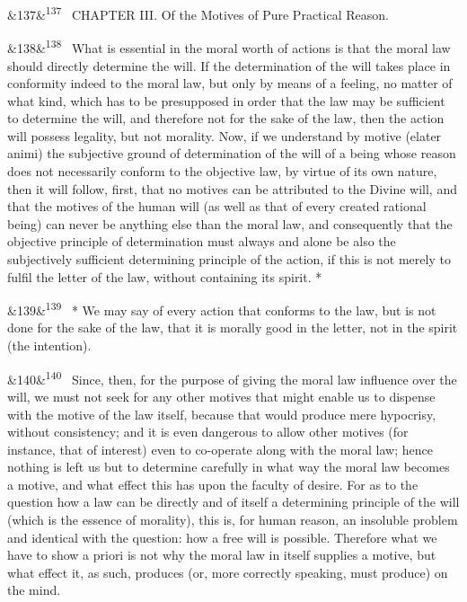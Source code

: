 \documentclass[12pt]{article}
\newcommand{\para}[1][]{\par\noindent\ifx&#1&\else\textsuperscript{\footnotesize #1}~\fi}
\begin{document}
\para[137] CHAPTER III. Of the Motives of Pure Practical Reason.

\para[138] What is essential in the moral worth of actions is that the moral law should directly determine the will. If the determination of the will takes place in conformity indeed to the moral law, but only by means of a feeling, no matter of what kind, which has to be presupposed in order that the law may be sufficient to determine the will, and therefore not for the sake of the law, then the action will possess legality, but not morality. Now, if we understand by motive (elater animi) the subjective ground of determination of the will of a being whose reason does not necessarily conform to the objective law, by virtue of its own nature, then it will follow, first, that no motives can be attributed to the Divine will, and that the motives of the human will (as well as that of every created rational being) can never be anything else than the moral law, and consequently that the objective principle of determination must always and alone be also the subjectively sufficient determining principle of the action, if this is not merely to fulfil the letter of the law, without containing its spirit. *

\para[139] * We may say of every action that conforms to the law, but is not done for the sake of the law, that it is morally good in the letter, not in the spirit (the intention).

\para[140] Since, then, for the purpose of giving the moral law influence over the will, we must not seek for any other motives that might enable us to dispense with the motive of the law itself, because that would produce mere hypocrisy, without consistency; and it is even dangerous to allow other motives (for instance, that of interest) even to co-operate along with the moral law; hence nothing is left us but to determine carefully in what way the moral law becomes a motive, and what effect this has upon the faculty of desire. For as to the question how a law can be directly and of itself a determining principle of the will (which is the essence of morality), this is, for human reason, an insoluble problem and identical with the question: how a free will is possible. Therefore what we have to show a priori is not why the moral law in itself supplies a motive, but what effect it, as such, produces (or, more correctly speaking, must produce) on the mind.
\end{document}
